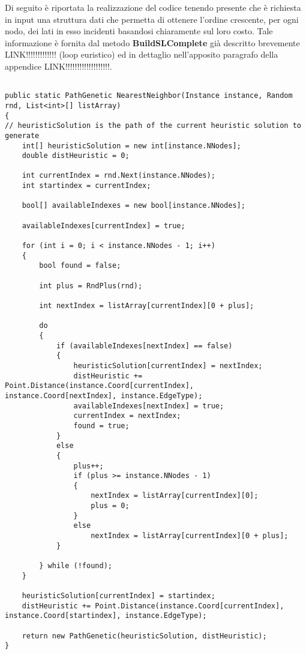 \documentclass[11pt]{article}
\begin{document}
Di seguito è riportata la realizzazione del codice tenendo presente che è richiesta in input una struttura dati che permetta di ottenere l'ordine crescente, per ogni nodo, dei lati in esso incidenti basandosi chiaramente sul loro costo. Tale informazione è fornita dal metodo \textbf{BuildSLComplete} già descritto brevemente LINK!!!!!!!!!!!!! (loop euristico) ed in dettaglio nell'apposito paragrafo della appendice LINK!!!!!!!!!!!!!!!!!!!.

\begin{lstlisting}

public static PathGenetic NearestNeighbor(Instance instance, Random rnd, List<int>[] listArray)
{
// heuristicSolution is the path of the current heuristic solution to generate
    int[] heuristicSolution = new int[instance.NNodes];
    double distHeuristic = 0;

    int currentIndex = rnd.Next(instance.NNodes);
    int startindex = currentIndex;

    bool[] availableIndexes = new bool[instance.NNodes];

    availableIndexes[currentIndex] = true;

    for (int i = 0; i < instance.NNodes - 1; i++)
    {
        bool found = false;

        int plus = RndPlus(rnd);

        int nextIndex = listArray[currentIndex][0 + plus];

        do
        {
            if (availableIndexes[nextIndex] == false)
            {
                heuristicSolution[currentIndex] = nextIndex;
                distHeuristic += Point.Distance(instance.Coord[currentIndex], instance.Coord[nextIndex], instance.EdgeType);
                availableIndexes[nextIndex] = true;
                currentIndex = nextIndex;
                found = true;
            }
            else
            {
                plus++;
                if (plus >= instance.NNodes - 1)
                {
                    nextIndex = listArray[currentIndex][0];
                    plus = 0;
                }
                else
                    nextIndex = listArray[currentIndex][0 + plus];
            }

        } while (!found);
    }

    heuristicSolution[currentIndex] = startindex;
    distHeuristic += Point.Distance(instance.Coord[currentIndex], instance.Coord[startindex], instance.EdgeType);

    return new PathGenetic(heuristicSolution, distHeuristic);
}

\end{lstlisting}
\end{document}

